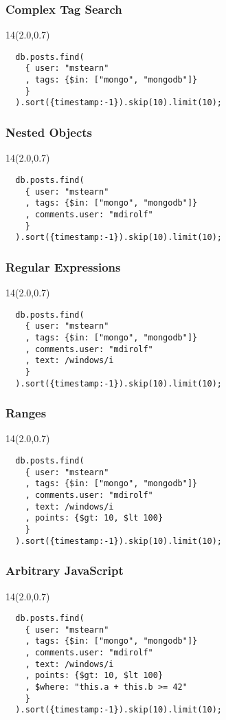 \documentclass{beamer}
\newcommand{\MongoLogo}{%
\begin{textblock}{14}(2.0,0.7)
  \pgfuseimage{logo}
\end{textblock}
}
\begin{document}
\begin{frame}[fragile]
  \frametitle{Complex Tag Search}
  \MongoLogo

  \begin{verbatim}
  db.posts.find(
    { user: "mstearn"
    , tags: {$in: ["mongo", "mongodb"]}
    }
  ).sort({timestamp:-1}).skip(10).limit(10);
  \end{verbatim}
  
\end{frame}

\begin{frame}[fragile]
  \frametitle{Nested Objects}
  \MongoLogo

  \begin{verbatim}
  db.posts.find(
    { user: "mstearn"
    , tags: {$in: ["mongo", "mongodb"]}
    , comments.user: "mdirolf"
    }
  ).sort({timestamp:-1}).skip(10).limit(10);
  \end{verbatim}
  
\end{frame}
\begin{frame}[fragile]
  \frametitle{Regular Expressions}
  \MongoLogo

  \begin{verbatim}
  db.posts.find(
    { user: "mstearn"
    , tags: {$in: ["mongo", "mongodb"]}
    , comments.user: "mdirolf"
    , text: /windows/i
    }
  ).sort({timestamp:-1}).skip(10).limit(10);
  \end{verbatim}
  
\end{frame}
\begin{frame}[fragile]
  \frametitle{Ranges}
  \MongoLogo

  \begin{verbatim}
  db.posts.find(
    { user: "mstearn"
    , tags: {$in: ["mongo", "mongodb"]}
    , comments.user: "mdirolf"
    , text: /windows/i
    , points: {$gt: 10, $lt 100}
    }
  ).sort({timestamp:-1}).skip(10).limit(10);
  \end{verbatim}
  
\end{frame}
\begin{frame}[fragile]
  \frametitle{Arbitrary JavaScript}
  \MongoLogo

  \begin{verbatim}
  db.posts.find(
    { user: "mstearn"
    , tags: {$in: ["mongo", "mongodb"]}
    , comments.user: "mdirolf"
    , text: /windows/i
    , points: {$gt: 10, $lt 100}
    , $where: "this.a + this.b >= 42"
    }
  ).sort({timestamp:-1}).skip(10).limit(10);
  \end{verbatim}
\end{frame}
\end{document}
